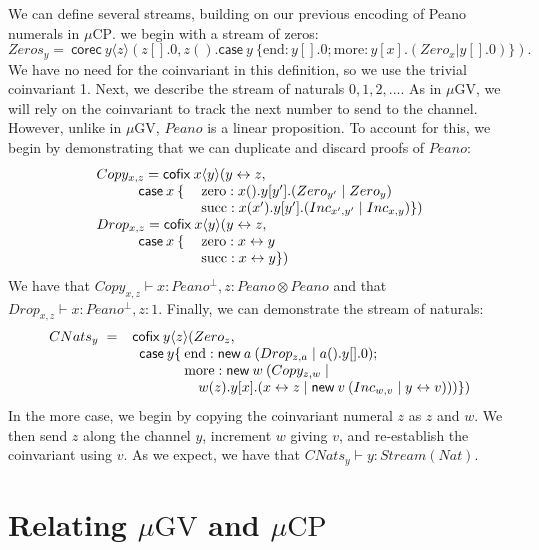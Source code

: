 \documentclass[orivec,envcountsame]{llncs}
\newcommand{\cpdual}[1]{#1^\perp}
\newcommand{\cptyp}[2]{#1 \vdash #2}
\newcommand{\mkwd}[1]{\mathsf{#1}}
\newcommand{\link}[2]{#1 \leftrightarrow #2}
\newcommand{\cut}[4]{\mkwd{new}\:#1 \: (#3 \mid #4)}
\newcommand{\corec}[5]{\mkwd{corec}\:#1 \langle #2 \rangle (#4,#5)}
\newcommand{\clabel}[1]{\mathrm{#1}}
\renewcommand{\case}[2]{\mkwd{case}\:#1\:\{#2\}}
\newcommand{\lrkwd}{\mkwd{cofix}}
\newcommand{\mucp}{$\mu\mathrm{CP}$\xspace}
\newcommand{\mugv}{$\mu\mathrm{GV}$\xspace}
\begin{document}
We can define several streams, building on our previous encoding of Peano numerals in \mucp.  we
begin with a stream of zeros:
\[
  Zeros_y =\ \corec{y}{z}{1}{z[].0}{z().\case{y}{\clabel{end}: y[].0; \clabel{more}: y[x].(Zero_x | y[].0)}}.
\]
We have no need for the coinvariant in this definition, so we use the trivial coinvariant 1.  Next,
we describe the stream of naturals $0,1,2,\dots$.  As in \mugv, we will rely on the coinvariant to
track the next number to send to the channel.  However, unlike in \mugv, $Peano$ is a linear
proposition.  To account for this, we begin by demonstrating that we can duplicate and discard
proofs of $Peano$:
\[\begin{array}{lll}
  \multicolumn{3}{l}{Copy_{x,z} = \lrkwd\:x\langle y \rangle ( \link{y}{z},} \\
  \quad \quad & \mkwd{case}\:x\:\{\:&\clabel{zero}: x().y[y'].(Zero_{y'} \mid Zero_{y}) \\
  & & \clabel{succ}: x(x').y[y'].(Inc_{x',y'} \mid Inc_{x,y}) \}) \\
  \multicolumn{3}{l}{Drop_{x,z} = \lrkwd\:x \langle y \rangle (\link{y}{z},} \\
  \quad \quad & \mkwd{case}\:x\:\{\:&\clabel{zero}: \link{x}{y} \\
  & & \clabel{succ}: \link{x}{y} \})
\end{array}\]
We have that $\cptyp{Copy_{x,z}}{x:\cpdual{Peano}, z:Peano \otimes Peano}$ and that
$\cptyp{Drop_{x,z}}{x:\cpdual{Peano},z:1}$. Finally, we can demonstrate the stream of naturals:
\[\begin{array}{r@{\hspace{2mm}}c@{\hspace{2mm}}l@{\hspace{0mm}}l@{\:}l}
  CNats_y & = & \mcl{3}{\lrkwd \: y \langle z \rangle (Zero_z,} \\
  & & \quad & \mkwd{case}\:y \{ & \clabel{end}: \cut{a}{}{Drop_{z,a}}{a().y[].0}; \\
  & & & & \clabel{more}: \mkwd{new}\:w\:(Copy_{z,w} \mid \\
  & & & & \quad w(z).y[x].(\link{x}{z} \mid \cut{v}{}{Inc_{w,v}}{\link{y}{v}}))\})
\end{array}\]
In the $\clabel{more}$ case, we begin by copying the coinvariant numeral $z$ as $z$ and $w$.  We
then send $z$ along the channel $y$, increment $w$ giving $v$, and re-establish the coinvariant
using $v$.  As we expect, we have that $\cptyp{CNats_y}{y:Stream(Nat)}$.

\section{Relating \mugv and \mucp}\label{sec:translation}
\end{document}
